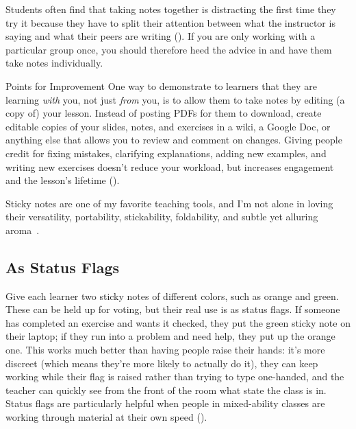 Students often find that taking notes together is distracting
the first time they try it
because they have to split their attention between
what the instructor is saying
and what their peers are writing ().
If you are only working with a particular group once,
you should therefore heed the advice in 
and have them take notes individually.

\begin{aside}{Points for Improvement}
  One way to demonstrate to learners that they are learning \emph{with} you,
  not just \emph{from} you,
  is to allow them to take notes by editing (a copy of) your lesson.
  Instead of posting PDFs for them to download,
  create editable copies of your slides, notes, and exercises
  in a wiki,
  a Google Doc,
  or anything else that allows you to review and comment on changes.
  Giving people credit for fixing mistakes,
  clarifying explanations,
  adding new examples,
  and writing new exercises doesn't reduce your workload,
  but increases engagement and the lesson's lifetime
  ().
\end{aside}


Sticky notes are one of my favorite teaching tools,
and I'm not alone in loving their versatility,
portability, stickability, foldability,
and subtle yet alluring aroma~\cite{Ward2015}.

\subsection*{As Status Flags}

Give each learner two sticky notes of different colors,
such as orange and green.
These can be held up for voting,
but their real use is as status flags.
If someone has completed an exercise and wants it checked,
they put the green sticky note on their laptop;
if they run into a problem and need help,
they put up the orange one.
This works much better than having people raise their hands:
it's more discreet (which means they're more likely to actually do it),
they can keep working while their flag is raised rather than trying to type one-handed,
and the teacher can quickly see from the front of the room what state the class is in.
Status flags are particularly helpful when people in mixed-ability classes
are working through material at their own speed ().

